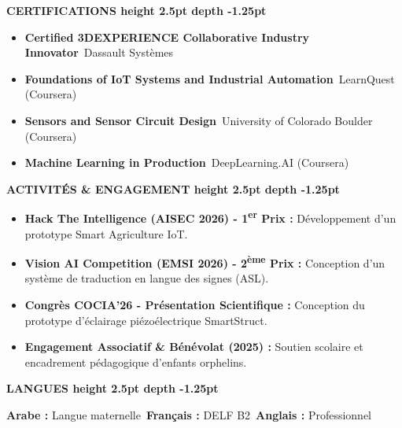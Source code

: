 \documentclass[10pt,a4paper]{altacv}
\renewcommand{\cvsection}[2][]{%
  \vspace{3pt}%
  {\color{heading}\Large\bfseries #2 \hspace{0.2em}\leaders\vrule height 2.5pt depth -1.25pt\hfill\mbox{}}\par\vspace{2.5pt}
}
\begin{document}
\cvsection{CERTIFICATIONS}
\begin{itemize}[leftmargin=*, label=\textbullet, nosep, itemsep=1.5pt]
  \item \textbf{Certified 3DEXPERIENCE Collaborative Industry Innovator}~\hfill {\color{emphasis}Dassault Systèmes}
  \item \textbf{Foundations of IoT Systems and Industrial Automation}~\hfill {\color{emphasis}LearnQuest (Coursera)}
  \item \textbf{Sensors and Sensor Circuit Design}~\hfill {\color{emphasis}University of Colorado Boulder (Coursera)}
  \item \textbf{Machine Learning in Production}~\hfill {\color{emphasis}DeepLearning.AI (Coursera)}
\end{itemize}

\cvsection{ACTIVITÉS \& ENGAGEMENT}
\begin{itemize}[leftmargin=*, label=\textbullet, nosep, itemsep=1.5pt]
  \item \textbf{Hack The Intelligence (AISEC 2026) - 1\textsuperscript{er} Prix :} Développement d’un prototype Smart Agriculture IoT.
  \item \textbf{Vision AI Competition (EMSI 2026) - 2\textsuperscript{ème} Prix :} Conception d’un système de traduction en langue des signes (ASL).
  \item \textbf{Congrès COCIA’26 - Présentation Scientifique :} Conception du prototype d’éclairage piézoélectrique SmartStruct.
  \item \textbf{Engagement Associatif \& Bénévolat (2025) :} Soutien scolaire et encadrement pédagogique d'enfants orphelins.
\end{itemize}

\cvsection{LANGUES}
\textbf{Arabe :} Langue maternelle~\hfill \textbf{Français :} DELF B2~\hfill \textbf{Anglais :} Professionnel
\end{document}
